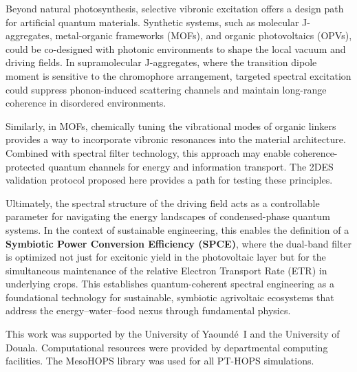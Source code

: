 \documentclass[journal=jpcl,manuscript=letter]{achemso}
\begin{document}
Beyond natural photosynthesis, selective vibronic excitation offers a design path for artificial quantum materials. Synthetic systems, such as molecular J-aggregates, metal-organic frameworks (MOFs), and organic photovoltaics (OPVs), could be co-designed with photonic environments to shape the local vacuum and driving fields. In supramolecular J-aggregates, where the transition dipole moment is sensitive to the chromophore arrangement, targeted spectral excitation could suppress phonon-induced scattering channels and maintain long-range coherence in disordered environments.

Similarly, in MOFs, chemically tuning the vibrational modes of organic linkers provides a way to incorporate vibronic resonances into the material architecture. Combined with spectral filter technology, this approach may enable coherence-protected quantum channels for energy and information transport. The 2DES validation protocol proposed here provides a path for testing these principles. 

Ultimately, the spectral structure of the driving field acts as a controllable parameter for navigating the energy landscapes of condensed-phase quantum systems. In the context of sustainable engineering, this enables the definition of a \textbf{Symbiotic Power Conversion Efficiency (SPCE)}, where the dual-band filter is optimized not just for excitonic yield in the photovoltaic layer but for the simultaneous maintenance of the relative Electron Transport Rate (ETR) in underlying crops. This establishes quantum-coherent spectral engineering as a foundational technology for sustainable, symbiotic agrivoltaic ecosystems that address the energy--water--food nexus through fundamental physics.


\begin{acknowledgement}
This work was supported by the University of Yaoundé~I and the University of Douala. Computational resources were provided by departmental computing facilities. The MesoHOPS library was used for all PT-HOPS simulations.
\end{acknowledgement}

\end{document}
